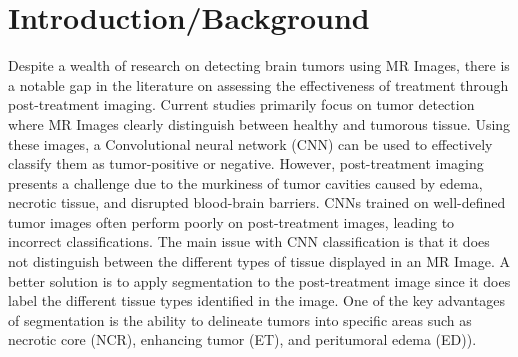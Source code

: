 \documentclass[12pt, onecolumn]{IEEEtran}
\begin{document}
\section{Introduction/Background}
Despite a wealth of research on detecting brain tumors using MR Images, there is a notable gap in the literature on assessing the effectiveness of treatment through post-treatment imaging.  Current studies primarily focus on tumor detection where MR Images clearly distinguish between healthy and tumorous tissue.  Using these images, a Convolutional neural network (CNN) can be used to effectively classify them as tumor-positive or negative.  However, post-treatment imaging presents a challenge due to the murkiness of tumor cavities caused by edema, necrotic tissue, and disrupted blood-brain barriers.  CNNs trained on well-defined tumor images often perform poorly on post-treatment images, leading to incorrect classifications.  The main issue with CNN classification is that it does not distinguish between the different types of tissue displayed in an MR Image.  A better solution is to apply segmentation to the post-treatment image since it does label the different tissue types identified in the image.  One of the key advantages of segmentation is the ability to delineate tumors into specific areas such as necrotic core (NCR), enhancing tumor (ET), and peritumoral edema (ED)\cite{bonato2025}). 
\end{document}
